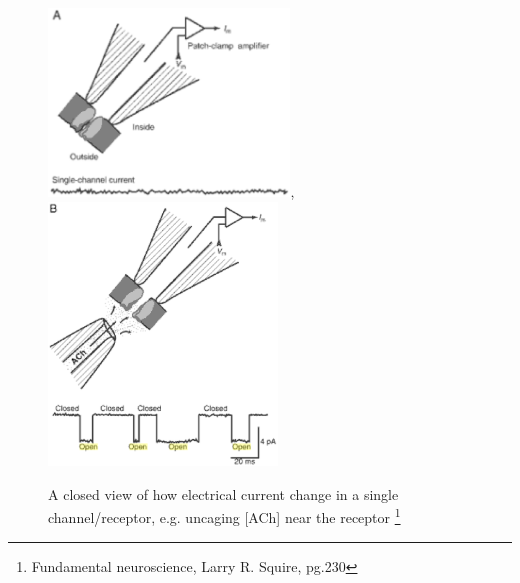 \begin{figure}[hbt]
 \centerline{
 \includegraphics[height=5cm]{./images/patch_clamp_single_channel_current.eps},
 \includegraphics[height=7cm]{./images/patch-clamp-closed-view.eps}}
\caption{A closed view of how electrical current change in a single
channel/receptor, e.g. uncaging [ACh] near the receptor \footnote{Fundamental
neuroscience, Larry R.
Squire, pg.230}}
\label{fig:pc-single-channel}
\end{figure}

